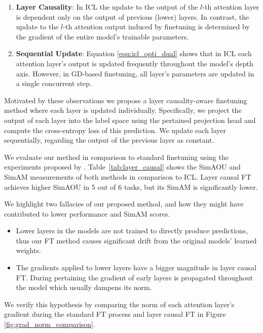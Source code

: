 \begin{enumerate}
	\item \textbf{Layer Causality}: In ICL the update to the output of the $l$-th attention layer is dependent only on the output of previous (lower) layers.
  In contrast, the update to the $l$-th attention output induced by finetuning is determined by the gradient of the entire model's trainable parameters.
	
  \item \textbf{Sequential Update}: Equation \ref{equ:icl_opti_dual} shows that in ICL each attention layer's output is updated frequently throughout the model's depth axis.
  However, in GD-based finetuning, all layer's parameters are updated in a single concurrent step.
\end{enumerate}




Motivated by these observations we propose a layer causality-aware finetuning method where each layer is updated individually.
Specifically, we project the output of each layer into the label space using the pertained projection head and compute the cross-entropy loss of this prediction.
We update each layer sequentially, regarding the output of the previous layer as constant.  

We evaluate our method in comparison to standard finetuning using the experiments proposed by \cite{dai2023gpt}.
Table~\ref{tab:layer_causal} shows the SimAOU and SimAM measurements of both methods in comparison to ICL.
Layer causal FT achieves higher SimAOU in 5 out of 6 tasks, but its SimAM is significantly lower.

We highlight two fallacies of our proposed method, and how they might have contributed to lower performance and SimAM scores.
\begin{itemize}
	\item Lower layers in the models are not trained to directly produce predictions, thus our FT method causes significant drift from the original models' learned weights.
	\item The gradients applied to lower layers have a bigger magnitude in layer causal FT.
				During pertaining the gradient of early layers is propagated throughout the model which usually dampens its norm.  
\end{itemize}

We verify this hypothesis by comparing the norm of each attention layer's gradient during the standard FT process and layer causal FT in Figure \ref{fig:grad_norm_comparison}.

